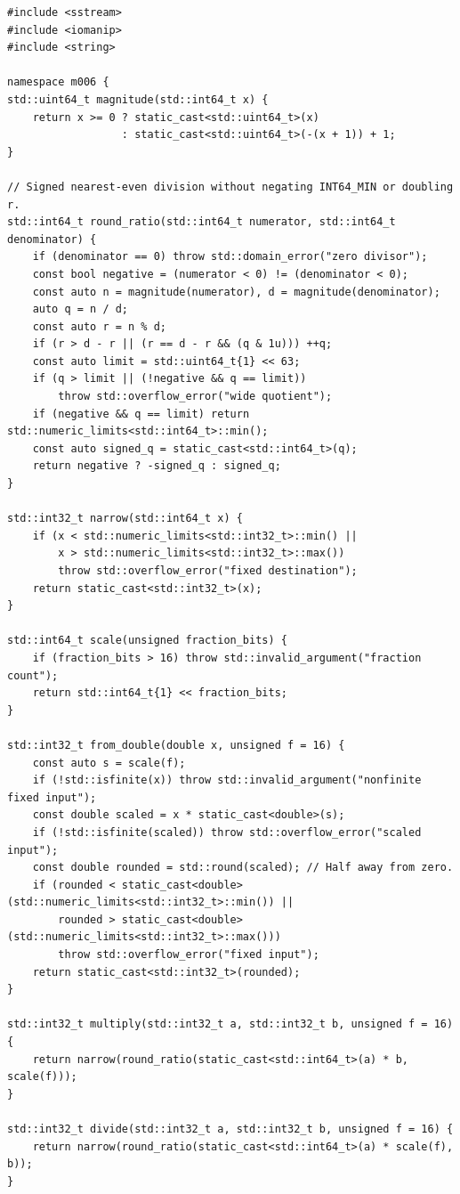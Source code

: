 \begin{verbatim}
#include <sstream>
#include <iomanip>
#include <string>

namespace m006 {
std::uint64_t magnitude(std::int64_t x) {
    return x >= 0 ? static_cast<std::uint64_t>(x)
                  : static_cast<std::uint64_t>(-(x + 1)) + 1;
}

// Signed nearest-even division without negating INT64_MIN or doubling r.
std::int64_t round_ratio(std::int64_t numerator, std::int64_t denominator) {
    if (denominator == 0) throw std::domain_error("zero divisor");
    const bool negative = (numerator < 0) != (denominator < 0);
    const auto n = magnitude(numerator), d = magnitude(denominator);
    auto q = n / d;
    const auto r = n % d;
    if (r > d - r || (r == d - r && (q & 1u))) ++q;
    const auto limit = std::uint64_t{1} << 63;
    if (q > limit || (!negative && q == limit))
        throw std::overflow_error("wide quotient");
    if (negative && q == limit) return std::numeric_limits<std::int64_t>::min();
    const auto signed_q = static_cast<std::int64_t>(q);
    return negative ? -signed_q : signed_q;
}

std::int32_t narrow(std::int64_t x) {
    if (x < std::numeric_limits<std::int32_t>::min() ||
        x > std::numeric_limits<std::int32_t>::max())
        throw std::overflow_error("fixed destination");
    return static_cast<std::int32_t>(x);
}

std::int64_t scale(unsigned fraction_bits) {
    if (fraction_bits > 16) throw std::invalid_argument("fraction count");
    return std::int64_t{1} << fraction_bits;
}

std::int32_t from_double(double x, unsigned f = 16) {
    const auto s = scale(f);
    if (!std::isfinite(x)) throw std::invalid_argument("nonfinite fixed input");
    const double scaled = x * static_cast<double>(s);
    if (!std::isfinite(scaled)) throw std::overflow_error("scaled input");
    const double rounded = std::round(scaled); // Half away from zero.
    if (rounded < static_cast<double>(std::numeric_limits<std::int32_t>::min()) ||
        rounded > static_cast<double>(std::numeric_limits<std::int32_t>::max()))
        throw std::overflow_error("fixed input");
    return static_cast<std::int32_t>(rounded);
}

std::int32_t multiply(std::int32_t a, std::int32_t b, unsigned f = 16) {
    return narrow(round_ratio(static_cast<std::int64_t>(a) * b, scale(f)));
}

std::int32_t divide(std::int32_t a, std::int32_t b, unsigned f = 16) {
    return narrow(round_ratio(static_cast<std::int64_t>(a) * scale(f), b));
}


\end{verbatim}
